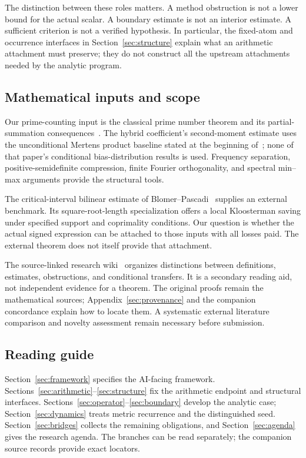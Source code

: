 The distinction between these roles matters. A method obstruction is not a lower bound for the actual scalar. A boundary estimate is not an interior estimate. A sufficient criterion is not a verified hypothesis. In particular, the fixed-atom and occurrence interfaces in Section~\ref{sec:structure} explain what an arithmetic attachment must preserve; they do not construct all the upstream attachments needed by the analytic program.

\subsection{Mathematical inputs and scope}
Our prime-counting input is the classical prime number theorem and its partial-summation consequences~\cite{selberg1949}. The hybrid coefficient's second-moment estimate uses the unconditional Mertens product baseline stated at the beginning of~\cite{lamzouri2015}; none of that paper's conditional bias-distribution results is used. Frequency separation, positive-semidefinite compression, finite Fourier orthogonality, and spectral min--max arguments provide the structural tools.

The critical-interval bilinear estimate of Blomer--Pascadi~\cite{blomer2026} supplies an external benchmark. Its square-root-length specialization offers a local Kloosterman saving under specified support and coprimality conditions. Our question is whether the actual signed expression can be attached to those inputs with all losses paid. The external theorem does not itself provide that attachment.

The source-linked research wiki~\cite{archiveframework} organizes distinctions between definitions, estimates, obstructions, and conditional transfers. It is a secondary reading aid, not independent evidence for a theorem. The original proofs remain the mathematical sources; Appendix~\ref{sec:provenance} and the companion concordance explain how to locate them. A systematic external literature comparison and novelty assessment remain necessary before submission.

\subsection{Reading guide}
Section~\ref{sec:framework} specifies the AI-facing framework. Sections~\ref{sec:arithmetic}--\ref{sec:structure} fix the arithmetic endpoint and structural interfaces. Sections~\ref{sec:operator}--\ref{sec:boundary} develop the analytic case; Section~\ref{sec:dynamics} treats metric recurrence and the distinguished seed. Section~\ref{sec:bridges} collects the remaining obligations, and Section~\ref{sec:agenda} gives the research agenda. The branches can be read separately; the companion source records provide exact locators.

